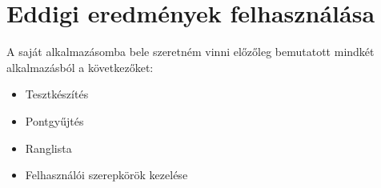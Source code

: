 \section{Eddigi eredmények felhasználása}
A saját alkalmazásomba bele szeretném vinni előzőleg bemutatott mindkét alkalmazásból a következőket:

\begin{itemize}
  \item {Tesztkészítés}
  \item {Pontgyűjtés}
  \item {Ranglista}
  \item {Felhasználói szerepkörök kezelése}
\end{itemize}
